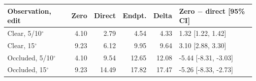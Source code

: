 \begin{tabular}{lrrrrl}\toprule
Observation, edit & Zero & Direct & Endpt. & Delta & Zero $-$ direct [95\% CI]\\\midrule
Clear, 5/10$^\circ$ & 4.10 & 2.79 & 4.54 & 4.33 & 1.32 [1.22, 1.42] \\
Clear, 15$^\circ$ & 9.23 & 6.12 & 9.95 & 9.64 & 3.10 [2.88, 3.30] \\
Occluded, 5/10$^\circ$ & 4.10 & 9.54 & 12.65 & 12.08 & -5.44 [-8.31, -3.03] \\
Occluded, 15$^\circ$ & 9.23 & 14.49 & 17.82 & 17.47 & -5.26 [-8.33, -2.73] \\
\bottomrule\end{tabular}
